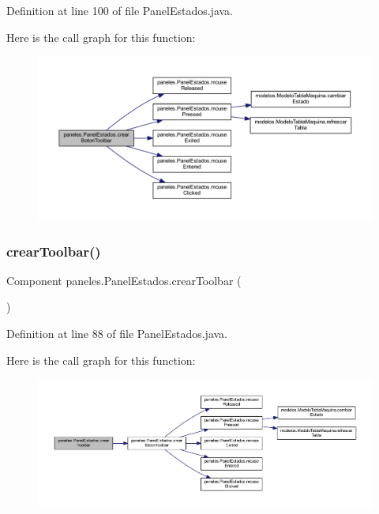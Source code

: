 Definition at line 100 of file Panel\+Estados.\+java.

Here is the call graph for this function\+:
\nopagebreak
\begin{figure}[H]
\begin{center}
\leavevmode
\includegraphics[width=350pt]{classpaneles_1_1_panel_estados_af627b3edddac65046fd93dc774904597_cgraph}
\end{center}
\end{figure}
\mbox{\label{classpaneles_1_1_panel_estados_ae62e5c6656177ec67c97cc2fe48d1e54}} 
\subsubsection{\texorpdfstring{crear\+Toolbar()}{crearToolbar()}}
{\footnotesize\ttfamily Component paneles.\+Panel\+Estados.\+crear\+Toolbar (\begin{DoxyParamCaption}{ }\end{DoxyParamCaption})}



Definition at line 88 of file Panel\+Estados.\+java.

Here is the call graph for this function\+:
\nopagebreak
\begin{figure}[H]
\begin{center}
\leavevmode
\includegraphics[width=350pt]{classpaneles_1_1_panel_estados_ae62e5c6656177ec67c97cc2fe48d1e54_cgraph}
\end{center}
\end{figure}
\mbox{\label{classpaneles_1_1_panel_estados_a8f949a32d4a35371a2f2b37a66ede21c}} 
